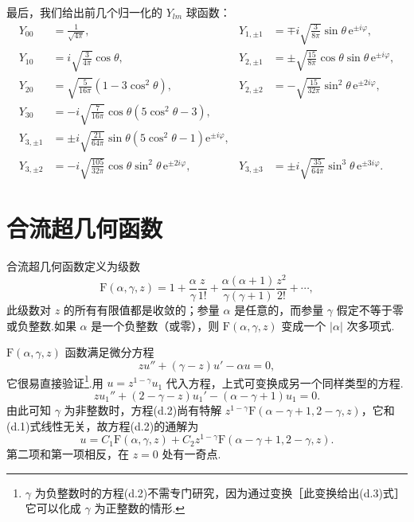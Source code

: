 最后，我们给出前几个归一化的 $Y_{lm}$ 球函数：
\begin{equation*}
\begin{aligned}
  Y_{00}&=\frac{1}{\sqrt{4\pi}},\qquad
  &Y_{1,\pm1}&=\mp i\sqrt{\frac{3}{8\pi}}\sin\theta\,\mathrm{e}^{\pm i\varphi},\\
  Y_{10}&=i\sqrt{\frac{3}{4\pi}}\cos\theta,\qquad
  &Y_{2,\pm1}&=\pm\sqrt{\frac{15}{8\pi}}\cos\theta\sin\theta\,\mathrm{e}^{\pm i\varphi},\\
  Y_{20}&=\sqrt{\frac{5}{16\pi}}\left(1-3\cos^2\theta\right),\qquad
  &Y_{2,\pm2}&=-\sqrt{\frac{15}{32\pi}}\sin^2\theta\,\mathrm{e}^{\pm 2i\varphi},\\
  Y_{30}&=-i\sqrt{\frac{7}{16\pi}}\cos\theta\left(5\cos^2\theta-3\right),\\
  Y_{3,\pm1}&=\pm i\sqrt{\frac{21}{64\pi}}\sin\theta\left(5\cos^2\theta-1\right)\mathrm{e}^{\pm i\varphi},\\
  Y_{3,\pm2}&=-i\sqrt{\frac{105}{32\pi}}\cos\theta\sin^2\theta\,\mathrm{e}^{\pm 2i\varphi},\qquad
  &Y_{3,\pm3}&=\pm i\sqrt{\frac{35}{64\pi}}\sin^3\theta\,\mathrm{e}^{\pm 3i\varphi}.
\end{aligned}
\end{equation*}

\section{合流超几何函数}

合流超几何函数定义为级数
\begin{equation}
  \mathrm{F}(\alpha,\gamma,z)=1+\frac{\alpha}{\gamma}\frac{z}{1!}
  +\frac{\alpha(\alpha+1)}{\gamma(\gamma+1)}\frac{z^2}{2!}+\cdots,
\end{equation}
此级数对 $z$ 的所有有限值都是收敛的；参量 $\alpha$ 是任意的，而参量 $\gamma$ 假定不等于零或负整数.如果 $\alpha$ 是一个负整数（或零），则 $\mathrm{F}(\alpha,\gamma,z)$ 变成一个 $|\alpha|$ 次多项式.

$\mathrm{F}(\alpha,\gamma,z)$ 函数满足微分方程
\begin{equation}
  zu''+(\gamma-z)u'-\alpha u=0,
\end{equation}
它很易直接验证\footnote{$\gamma$ 为负整数时的方程(d.2)不需专门研究，因为通过变换［此变换给出(d.3)式］它可以化成 $\gamma$ 为正整数的情形.}.用 $u=z^{1-\gamma}u_1$ 代入方程，上式可变换成另一个同样类型的方程.
\begin{equation}
  zu_1''+(2-\gamma-z)u_1'-(\alpha-\gamma+1)u_1=0.
\end{equation}
由此可知 $\gamma$ 为非整数时，方程(d.2)尚有特解 $z^{1-\gamma}\mathrm{F}(\alpha-\gamma+1,2-\gamma,z)$，它和(d.1)式线性无关，故方程(d.2)的通解为
\begin{equation}
  u=C_1\mathrm{F}(\alpha,\gamma,z)
  +C_2z^{1-\gamma}\mathrm{F}(\alpha-\gamma+1,2-\gamma,z).
\end{equation}
第二项和第一项相反，在 $z=0$ 处有一奇点.

